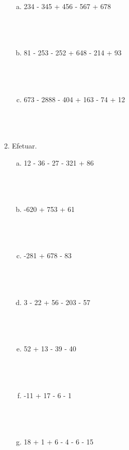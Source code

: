 \documentclass[a4paper,14pt]{article}
\begin{document}
\begin{multicols}{2}
\begin{enumerate}
\begin{enumerate}[a)]
    				\item 234 - 345 + 456 - 567 + 678 \\\\\\\\
    				\item 81 - 253 - 252 + 648 - 214 + 93 \\\\\\\\
    				\item 673 - 2888 - 404 + 163 - 74 + 12 \\\\\\\\
    			\end{enumerate}
    			\item Efetuar.
    			\begin{enumerate}[a)]
    				\item 12 - 36 - 27 - 321 + 86 \\\\\\\\
    				\item -620 + 753 + 61 \\\\\\\\
    				\item -281 + 678 - 83 \\\\\\\\
    				\item 3 - 22 + 56 - 203 - 57 \\\\\\\\
    				\item 52 + 13 - 39 - 40 \\\\\\\\
    				\item -11 + 17 - 6 - 1 \\\\\\\\
    				\item 18 + 1 + 6 - 4 - 6 - 15 \\\\\\\\

\end{enumerate}
\end{enumerate}
\end{multicols}
\end{document}
